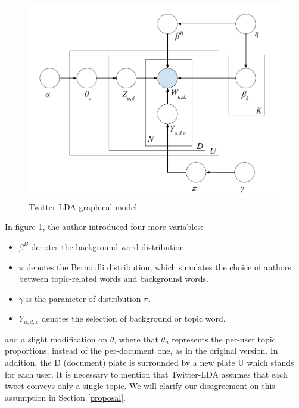 \documentclass[11pt]{article}
\begin{document}
\begin{figure}[H]
	\centering
	\includegraphics[scale=0.3]{twitter_lda_model}
	\caption{Twitter-LDA graphical model}
	\label{fig:twitter_lda_model}
\end{figure}

In figure \ref{fig:twitter_lda_model}, the author introduced four more variables:
\begin{itemize}
	\item $\beta^B$ denotes the background word distribution
	\item $\pi$ denotes the Bernoulli distribution, which simulates the choice of authors between topic-related words and background words.
	\item $\gamma$ is the parameter of distribution $\pi$.
	\item $Y_{u,d,v}$ denotes the selection of background or topic word.
\end{itemize} 
and a slight modification on $\theta$, where that $\theta_u$ represents the per-user topic proportions, instead of the per-document one, as in the original version. In addition, the D (document) plate is surrounded by a new plate U which stands for each user. It is necessary to mention that Twitter-LDA assumes that each tweet conveys only a single topic. We will clarify our disagreement on this assumption in Section \ref{proposal}.
\end{document}
